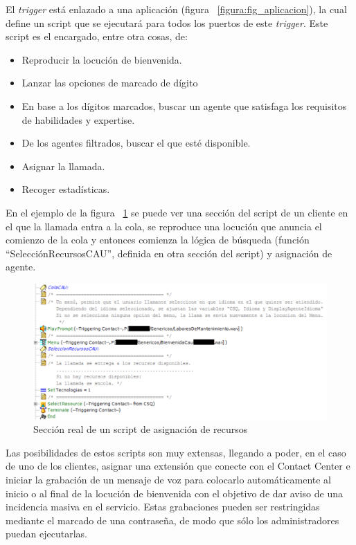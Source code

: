 \documentclass[a4paper, 12pt]{book}
\begin{document}
El \emph{trigger} está enlazado a una aplicación (figura ~\ref{figura:fig_aplicacion}), la cual define un script que se ejecutará para todos los puertos de este \emph{trigger}. Este script es el encargado, entre otra cosas, de:
\begin{itemize}
  \item Reproducir la locución de bienvenida.
  \item Lanzar las opciones de marcado de dígito
  \item En base a los dígitos marcados, buscar un agente que satisfaga los requisitos de habilidades y expertise.
  \item De los agentes  filtrados, buscar el que esté disponible.
  \item Asignar la llamada.
  \item Recoger estadísticas.
\end{itemize}


En el ejemplo de la figura ~\ref{figura:fig_script} se puede ver una sección del script de un cliente en el que la llamada entra a la cola, se reproduce una locución que anuncia el comienzo de la cola y entonces comienza la lógica de búsqueda (función ``SelecciónRecursosCAU'', definida en otra sección del script) y asignación de agente.

\begin{figure}[h!]
  \centering
  \includegraphics[scale = 0.8]{img/fig_script}
  \caption{Sección real de un script de asignación de recursos}
  \label{figura:fig_script}
\end{figure}

Las posibilidades de estos scripts son muy extensas, llegando a poder, en el caso de uno de los clientes, asignar una extensión que conecte con el Contact Center e iniciar la grabación de un mensaje de voz para colocarlo automáticamente al inicio o al final de la locución de bienvenida con el objetivo de dar aviso de una incidencia masiva en el servicio. 
Estas grabaciones pueden ser restringidas mediante el marcado de una contraseña, de modo que sólo los administradores puedan ejecutarlas.
\end{document}
